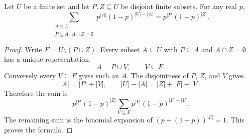 \begin{helper}
Let \(U\) be a finite set and let \(P,Z\subseteq U\) be disjoint finite
subsets.  For any real \(p\),
\[
\sum_{\substack{A\subseteq U\\ P\subseteq A,\ A\cap Z=\emptyset}}
  p^{|A|}(1-p)^{|U|-|A|}
=p^{|P|}(1-p)^{|Z|}.
\]
\end{helper}
\begin{proof}
Write \(F=U\setminus(P\cup Z)\).  Every subset \(A\subseteq U\) with
\(P\subseteq A\) and \(A\cap Z=\emptyset\) has a unique representation
\[
A=P\cup V,\qquad V\subseteq F.
\]
Conversely every \(V\subseteq F\) gives such an \(A\).  The disjointness of
\(P\), \(Z\), and \(V\) gives
\[
|A|=|P|+|V|,\qquad |U|-|A|=|Z|+|F|-|V|.
\]
Therefore the sum is
\[
p^{|P|}(1-p)^{|Z|}
\sum_{V\subseteq F}p^{|V|}(1-p)^{|F|-|V|}.
\]
The remaining sum is the binomial expansion of
\((p+(1-p))^{|F|}=1\).  This proves the formula.
\end{proof}
